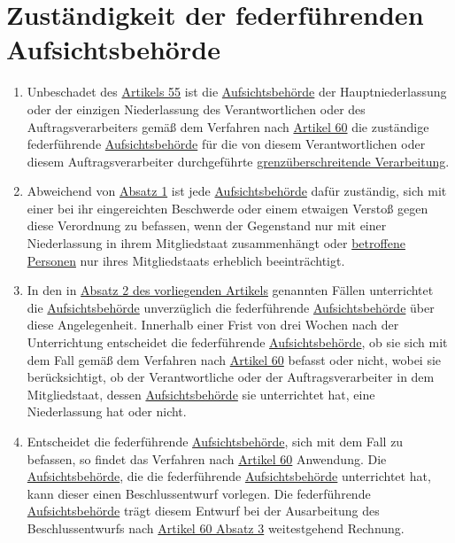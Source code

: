 \chapter{Zuständigkeit der federführenden Aufsichtsbehörde}
\label{ch:56}


\begin{enumerate}

  \item Unbeschadet des \hyperref[ch:55]{Artikels 55} ist die \hyperref[itm:04-21]{Aufsichtsbehörde} der Hauptniederlassung oder der einzigen
   Niederlassung des Verantwortlichen oder des Auftragsverarbeiters gemäß dem Verfahren nach \hyperref[ch:60]
   {Artikel 60} die zuständige federführende \hyperref[itm:04-21]{Aufsichtsbehörde} für die von diesem Verantwortlichen oder diesem
   Auftragsverarbeiter durchgeführte \hyperref[itm:04-23]{grenzüberschreitende Verarbeitung}.
  \label{itm:56-1}

  \item Abweichend von \hyperref[itm:56-1]{Absatz 1} ist jede \hyperref[itm:04-21]{Aufsichtsbehörde} dafür zuständig, sich mit einer bei ihr
   eingereichten Beschwerde oder einem etwaigen Verstoß gegen diese Verordnung zu befassen, wenn der Gegenstand nur mit
   einer Niederlassung in ihrem Mitgliedstaat zusammenhängt oder \hyperref[itm:04-1]{betroffene Personen} nur ihres Mitgliedstaats erheblich
   beeinträchtigt.
  \label{itm:56-2}

  \item In den in \hyperref[itm:56-2]{Absatz 2 des vorliegenden Artikels} genannten Fällen unterrichtet die
   \hyperref[itm:04-21]{Aufsichtsbehörde} unverzüglich die federführende \hyperref[itm:04-21]{Aufsichtsbehörde} über diese Angelegenheit. Innerhalb einer Frist von
   drei Wochen nach der Unterrichtung entscheidet die federführende \hyperref[itm:04-21]{Aufsichtsbehörde}, ob sie sich mit dem Fall gemäß
   dem Verfahren nach \hyperref[ch:60]{Artikel 60} befasst oder nicht, wobei sie berücksichtigt, ob der Verantwortliche
   oder der Auftragsverarbeiter in dem Mitgliedstaat, dessen \hyperref[itm:04-21]{Aufsichtsbehörde} sie unterrichtet hat, eine Niederlassung
   hat oder nicht.
  \label{itm:56-3}

  \item Entscheidet die federführende \hyperref[itm:04-21]{Aufsichtsbehörde}, sich mit dem Fall zu befassen, so findet das Verfahren nach
   \hyperref[ch:60]{Artikel 60} Anwendung. Die \hyperref[itm:04-21]{Aufsichtsbehörde}, die die federführende \hyperref[itm:04-21]{Aufsichtsbehörde} unterrichtet
    hat, kann dieser einen Beschlussentwurf vorlegen. Die federführende \hyperref[itm:04-21]{Aufsichtsbehörde} trägt diesem Entwurf bei der
    Ausarbeitung des Beschlussentwurfs nach \hyperref[itm:60-3]{Artikel 60 Absatz 3} weitestgehend Rechnung.
  \label{itm:56-4}


\end{enumerate}
